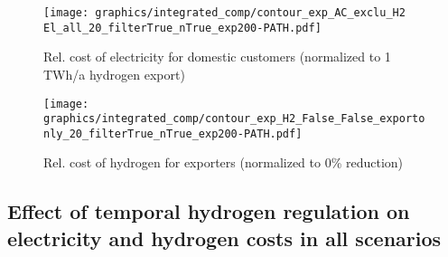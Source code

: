 \begin{figure*}[h!]
    \centering
    \begin{subfigure}[b]{0.49\linewidth}
        \centering
        \texttt{[image: graphics/integrated\_comp/contour\_exp\_AC\_exclu\_H2 El\_all\_20\_filterTrue\_nTrue\_exp200-PATH.pdf]}
        \caption{Rel. cost of electricity for domestic customers (normalized to 1 TWh/a hydrogen export)}
        \label{fig:expense_ac_200}
    \end{subfigure}
    \hfill
    \begin{subfigure}[b]{0.49\linewidth}
        \centering
        \texttt{[image: graphics/integrated\_comp/contour\_exp\_H2\_False\_False\_exportonly\_20\_filterTrue\_nTrue\_exp200-PATH.pdf]}
        \caption{Rel. cost of hydrogen for exporters (normalized to 0\% \co reduction)}
        \label{fig:expense_h2_200}
    \end{subfigure}
    \hfill
    \caption{  
    Rel. cost for domestic electricity consumers (\ref{fig:expense_ac_200}) and hydrogen exporters (\ref{fig:expense_h2_200}),
    normalized to costs at 1 TWh/a hydrogen export (\ref{fig:expense_ac_200}) and
    to 0\% \co reduction (\ref{fig:expense_h2_200})
    at each domestic climate change mitigation level. Domestic electricity consumers profit from increasing hydrogen exports, especially at low domestic climate change mitigation and high exports. Hydrogen exporters profit from domestic climate change mitigation at medium mitigation efforts. Both (\ref{fig:expense_ac_200}) and (\ref{fig:expense_h2_200}) include possible pathways of i) quick exports and slow climate change mitigation, ii) balanced exports and mitigation and iii) slow exports and quick climate change mitigation.}
    \label{fig:expenses_default_200}
\end{figure*}


\subsection{Effect of temporal hydrogen regulation on electricity and hydrogen costs in all scenarios} 

